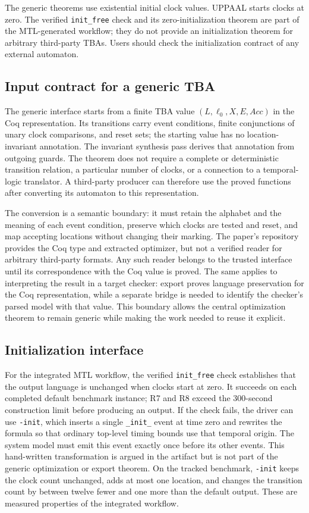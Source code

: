 \documentclass{ieeeaccess}
\begin{document}
The generic theorems use existential initial clock values. UPPAAL starts clocks at zero. The verified \texttt{init\_free} check and its zero-initialization theorem are part of the MTL-generated workflow; they do not provide an initialization theorem for arbitrary third-party TBAs. Users should check the initialization contract of any external automaton.

\subsection{Input contract for a generic TBA}
\label{sec:generic-input}
The generic interface starts from a finite TBA value
$(L,\ell_0,X,E,\mathit{Acc})$ in the Coq representation. Its transitions carry
event conditions, finite conjunctions of unary clock comparisons, and reset
sets; the starting value has no location-invariant annotation. The invariant
synthesis pass derives that annotation from outgoing guards. The theorem
does not require a complete or deterministic transition relation, a particular
number of clocks, or a connection to a temporal-logic translator. A third-party
producer can therefore use the proved functions after converting its automaton
to this representation.

The conversion is a semantic boundary: it must retain the alphabet and the
meaning of each event condition, preserve which clocks are tested and reset,
and map accepting locations without changing their marking. The paper's
repository provides the Coq type and extracted optimizer, but not a verified
reader for arbitrary third-party formats. Any such reader belongs to the
trusted interface until its correspondence with the Coq value is proved. The
same applies to interpreting the result in a target checker: export proves
language preservation for the Coq representation, while a separate bridge is
needed to identify the checker's parsed model with that value. This boundary
allows the central optimization theorem to remain generic while making the
work needed to reuse it explicit.

\subsection{Initialization interface}
For the integrated MTL workflow, the verified \texttt{init\_free} check
establishes that the output language is unchanged when clocks start at zero.
It succeeds on each completed default benchmark instance; R7 and R8 exceed
the 300-second construction limit before producing an output. If the check
fails, the driver can use \texttt{-init}, which inserts a single
\texttt{\_init\_} event at time zero and rewrites the formula so that ordinary
top-level timing bounds use that temporal origin. The system model must emit
this event exactly once before its other events. This hand-written
transformation is argued in the artifact but is not part of the generic
optimization or export theorem. On the tracked benchmark, \texttt{-init}
keeps the clock count unchanged, adds at most one location, and changes the
transition count by between twelve fewer and one more than the default
output. These are measured properties of the integrated workflow.
\end{document}
